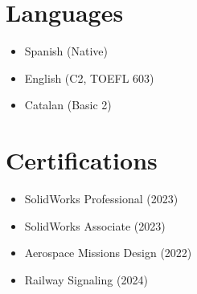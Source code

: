 \documentclass[11pt,a4paper]{article}
\begin{document}
\begin{minipage}[t]{.3\textwidth}
{{\section*{Languages}
\footnotesize
\begin{itemize}
    \item Spanish (Native)
    \item English (C2, TOEFL 603)
    \item Catalan (Basic 2)
\end{itemize}
\vspace{1em}

\section*{Certifications}
\footnotesize
\begin{itemize}
    \item SolidWorks Professional (2023)
    \item SolidWorks Associate (2023)
    \item Aerospace Missions Design (2022)
    \item Railway Signaling (2024)
\end{itemize}

\vspace*{3em} %
}}
\end{minipage}%
\hfill
\end{document}
